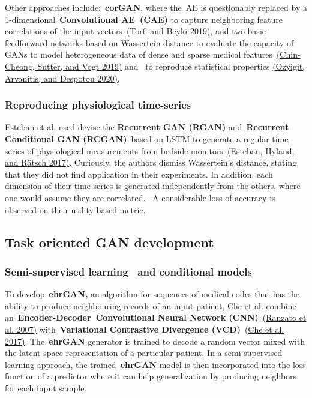 \documentclass[10pt]{article}
\begin{document}
Other approaches include:~\textbf{corGAN}, where the~AE is questionably
replaced by a 1-dimensional~\textbf{Convolutional AE~(CAE)} to capture
neighboring feature correlations of the input
vectors~\hyperref[csl:37]{(Torfi and Beyki 2019)}, and two basic feedforward networks based on
Wassertein distance to evaluate the capacity of GANs to model
heterogeneous data of dense and sparse medical
features~\hyperref[csl:38]{(Chin-Cheong, Sutter, and Vogt 2019)} and~ to reproduce statistical properties
\hyperref[csl:30]{(Ozyigit, Arvanitis, and Despotou 2020)}.~ ~

\subsubsection{Reproducing physiological
time-series}

{\label{422879}}

Esteban et al. used devise the \textbf{Recurrent GAN (RGAN)}
and~\textbf{Recurrent Conditional GAN (RCGAN)}~based on LSTM to generate
a regular time-series of physiological measurements from bedside
monitors~\hyperref[csl:5]{(Esteban, Hyland, and R{\"a}tsch 2017)}. Curiously, the authors dismiss Wassertein's
distance, stating that they did not find application in their
experiments. In addition, each dimension of their time-series is
generated independently from the others, where one would assume they are
correlated.~ A considerable loss of accuracy is observed on their
utility based metric.

\subsection{Task oriented GAN
development}

{\label{185551}}

\subsubsection{Semi-supervised learning~ and conditional
models}

{\label{425928}}

To develop~\textbf{ehrGAN,} an algorithm for sequences of medical codes
that has the ability to produce neighbouring records of an input
patient, Che et al. combine an~\textbf{Encoder-Decoder~Convolutional
Neural Network (CNN)}~\hyperref[csl:48]{(Ranzato et al. 2007)} with~\textbf{Variational
Contrastive Divergence (VCD)}~\hyperref[csl:15]{(Che et al. 2017)}. The~\textbf{ehrGAN}
generator is trained to decode a random vector mixed with the latent
space representation of a particular patient. In a semi-supervised
learning approach, the trained~\textbf{ehrGAN} model is then
incorporated into the loss function of a predictor where it can help
generalization by producing neighbors for each input sample.~
\end{document}
